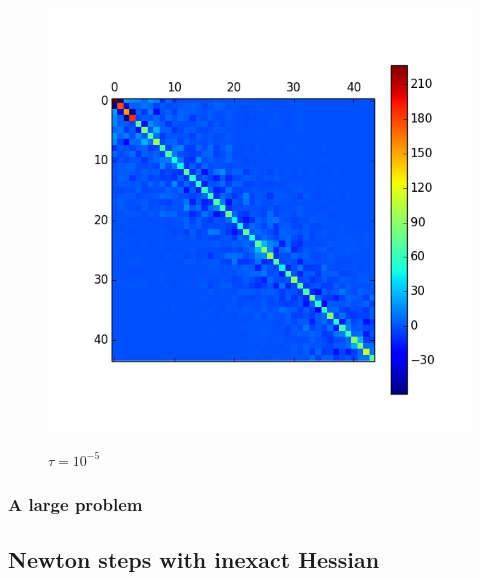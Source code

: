\begin{figure}[h]
  \centering
  \includegraphics[scale = 0.5]{./Figures/SmallProblemSmallTau.png}\\
  \caption{$\tau = 10^{-5}$}
  \label{f:SmallProblemSmallTau}
\end{figure}

\subsubsection{A large problem}

\subsection{Newton steps with inexact Hessian}







